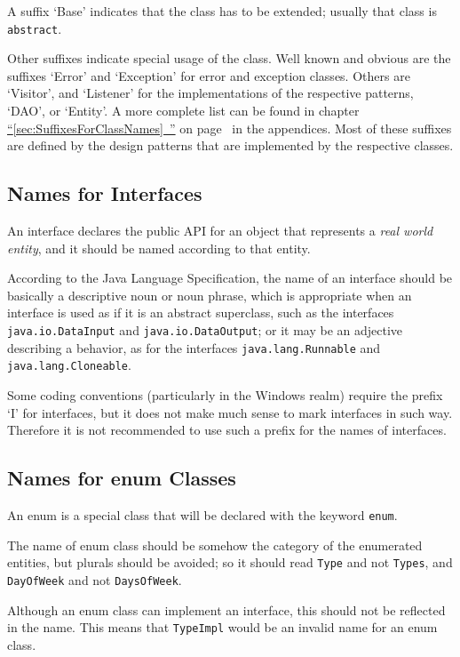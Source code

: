 \documentclass[11pt,a4paper, titlepage, parskip=half, headsepline, footsepline, cleardoublepage=current, headheight=1cm]{scrbook}
\newcommand*{\tqfullvref}[1]{\hyperref[{#1}]{“\ref*{#1}~\nameref*{#1}”} on page~\pageref{#1}}
\begin{document}
A suffix ‘Base’ indicates that the class has to be extended; usually that class is \lstinline|abstract|.

Other suffixes indicate special usage of the class. Well known and obvious are the suffixes ‘Error’ and ‘Exception’ for error and exception classes. Others are ‘Visitor’, and ‘Listener’ for the implementations of the respective patterns, ‘DAO’, or ‘Entity’. A more complete list can be found in chapter \tqfullvref{sec:SuffixesForClassNames} in the appendices. Most of these suffixes are defined by the design patterns that are implemented by the respective classes.

\subsection{Names for Interfaces}\label{sec:NamesForInterfaces}
An interface declares the public API for an object that represents a \textit{real world entity}, and it should be named according to that entity.

According to the Java Language Specification\autocite{ORACLE_DOC_LANGUAGE_SPECIFICATION:Declarations}, the name of an interface should be basically a descriptive noun or noun phrase, which is appropriate when an interface is used as if it is an abstract superclass, such as the interfaces \lstinline|java.io.DataInput| and \lstinline|java.io.DataOutput|; or it may be an adjective describing a behavior, as for the interfaces \lstinline|java.lang.Runnable|\autocite{ORACLE_DOC_RUNNABLE_INTERFACE} and \lstinline|java.lang.Cloneable|\autocite{ORACLE_DOC_CLONEABLE_INTERFACE}.

Some coding conventions (particularly in the Windows realm) require the prefix ‘I’ for interfaces, but it does not make much sense to mark interfaces in such way. Therefore it is not recommended to use such a prefix for the names of interfaces.

\subsection{Names for enum Classes}\label{sec:NamesForEnumClasses}
An enum is a special class that will be declared with the keyword \lstinline|enum|.

The name of enum class should be somehow the category of the enumerated entities, but plurals should be avoided; so it should read \lstinline|Type| and not \lstinline|Types|, and \lstinline|DayOfWeek| and not \lstinline|DaysOfWeek|.

Although an enum class can implement an interface, this should not be reflected in the name. This means that \lstinline|TypeImpl| would be an invalid name for an enum class.
\end{document}
